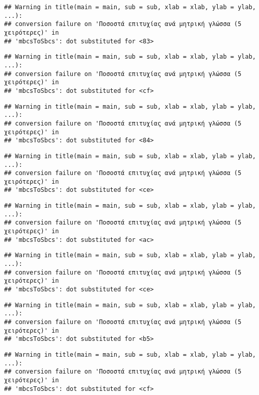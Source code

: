 \documentclass[
]{article}
\begin{document}
\begin{verbatim}
## Warning in title(main = main, sub = sub, xlab = xlab, ylab = ylab, ...):
## conversion failure on 'Ποσοστά επιτυχίας ανά μητρική γλώσσα (5 χειρότερες)' in
## 'mbcsToSbcs': dot substituted for <83>
\end{verbatim}

\begin{verbatim}
## Warning in title(main = main, sub = sub, xlab = xlab, ylab = ylab, ...):
## conversion failure on 'Ποσοστά επιτυχίας ανά μητρική γλώσσα (5 χειρότερες)' in
## 'mbcsToSbcs': dot substituted for <cf>
\end{verbatim}

\begin{verbatim}
## Warning in title(main = main, sub = sub, xlab = xlab, ylab = ylab, ...):
## conversion failure on 'Ποσοστά επιτυχίας ανά μητρική γλώσσα (5 χειρότερες)' in
## 'mbcsToSbcs': dot substituted for <84>
\end{verbatim}

\begin{verbatim}
## Warning in title(main = main, sub = sub, xlab = xlab, ylab = ylab, ...):
## conversion failure on 'Ποσοστά επιτυχίας ανά μητρική γλώσσα (5 χειρότερες)' in
## 'mbcsToSbcs': dot substituted for <ce>
\end{verbatim}

\begin{verbatim}
## Warning in title(main = main, sub = sub, xlab = xlab, ylab = ylab, ...):
## conversion failure on 'Ποσοστά επιτυχίας ανά μητρική γλώσσα (5 χειρότερες)' in
## 'mbcsToSbcs': dot substituted for <ac>
\end{verbatim}

\begin{verbatim}
## Warning in title(main = main, sub = sub, xlab = xlab, ylab = ylab, ...):
## conversion failure on 'Ποσοστά επιτυχίας ανά μητρική γλώσσα (5 χειρότερες)' in
## 'mbcsToSbcs': dot substituted for <ce>
\end{verbatim}

\begin{verbatim}
## Warning in title(main = main, sub = sub, xlab = xlab, ylab = ylab, ...):
## conversion failure on 'Ποσοστά επιτυχίας ανά μητρική γλώσσα (5 χειρότερες)' in
## 'mbcsToSbcs': dot substituted for <b5>
\end{verbatim}

\begin{verbatim}
## Warning in title(main = main, sub = sub, xlab = xlab, ylab = ylab, ...):
## conversion failure on 'Ποσοστά επιτυχίας ανά μητρική γλώσσα (5 χειρότερες)' in
## 'mbcsToSbcs': dot substituted for <cf>
\end{verbatim}
\end{document}
